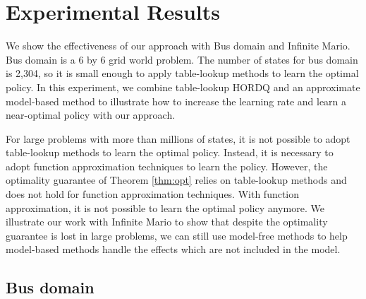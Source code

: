 
\chapter{Experimental Results}

We show the effectiveness of our approach with 
Bus domain and Infinite Mario.
Bus domain is a 6 by 6 grid world problem. 
The number of states for bus domain is
2,304, so it is small enough to apply table-lookup methods to learn
the optimal policy. In this experiment, we combine table-lookup HORDQ and an approximate model-based method 
to illustrate how to increase the learning rate and learn a near-optimal policy with our approach.

For large problems with more than millions of states, it is not possible to adopt
table-lookup methods to learn the optimal policy.
Instead, it is necessary to adopt function approximation techniques to learn the policy.
However, the optimality guarantee of Theorem \ref{thm:opt} relies on table-lookup methods and 
does not hold for function approximation techniques.
With function approximation, it is not possible to learn the optimal policy anymore.
We illustrate our work with Infinite Mario to show that despite the optimality guarantee is lost in
large problems, we can still use model-free methods to help model-based methods handle the effects which
are not included in the model. 



\section{Bus domain}
\label{se:domain}


